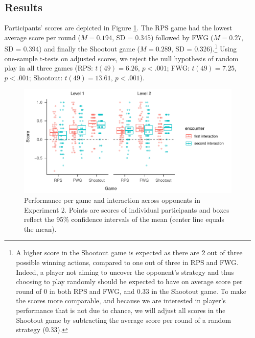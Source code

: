 \documentclass[english,man,floatsintext]{apa6}
\begin{document}
\hypertarget{results-1}{%
\subsection{Results}\label{results-1}}

Participants' scores are depicted in Figure \ref{fig:exp2-score-by-opp}. The RPS game had the lowest average score per round (\(M = 0.194\), SD = 0.345) followed by FWG (\(M = 0.27\), SD = 0.394) and finally the Shootout game (\(M = 0.289\), SD = 0.326).\footnote{A higher score in the Shootout game is expected as there are 2 out of three possible winning actions, compared to one out of three in RPS and FWG. Indeed, a player not aiming to uncover the opponent's strategy and thus choosing to play randomly should be expected to have on average score per round of 0 in both RPS and FWG, and 0.33 in the Shootout game. To make the scores more comparable, and because we are interested in player's performance that is not due to chance, we will adjust all scores in the Shootout game by subtracting the average score per round of a random strategy (0.33).} Using one-sample t-tests on adjusted scores, we reject the null hypothesis of random play in all three games (RPS: \(t(49) = 6.26\), \(p < .001\); FWG: \(t(49) = 7.25\), \(p < .001\); Shootout: \(t(49) = 13.61\), \(p < .001\)).

\begin{figure}

{\centering \includegraphics{paper_draft_2021_files/figure-latex/exp2-score-by-opp-1} 

}

\caption{\label{fig:exp2-score-by-opp}Performance per game and interaction across opponents in Experiment 2. Points are scores of individual participants and boxes reflect the 95\% confidence intervals of the mean (center line equals the mean).}\label{fig:exp2-score-by-opp}
\end{figure}
\end{document}
